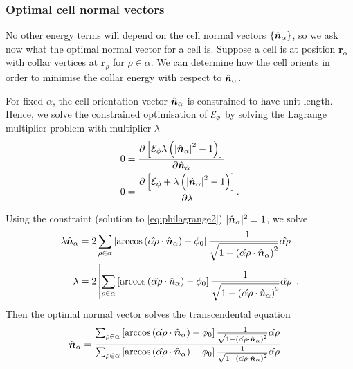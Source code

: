 \subsubsection{Optimal cell normal vectors} \label{subsubsec:opt_norm}

No other energy terms will depend on the cell normal vectors $\{ \hat{\bm{n}}_\alpha \}$, so we ask now what the optimal normal vector for a cell is. Suppose a cell is at position $\bm{r}_\alpha$ with collar vertices at $\bm{r}_\rho$ for $\rho \in \alpha$. We can determine how the cell orients in order to minimise the collar energy with respect to $\hat{\bm{n}}_\alpha$. 

For fixed $\alpha$, the cell orientation vector $\hat{\bm{n}}_\alpha$ is constrained to have unit length. Hence, we solve the constrained optimisation of $\mathcal{E}_\phi$ by solving the Lagrange multiplier problem with multiplier $\lambda$
\begin{align}
    0 &= \frac{\partial \left[ \mathcal{E}_\phi \lambda\left( \left| \hat{\bm{n}}_\alpha\right|^2 - 1\right) \right] }{\partial \hat{\bm{n}}_\alpha} \label{eq:philagrange1} \\
    0 &= \frac{\partial \left[ \mathcal{E}_\phi + \lambda\left( \left| \hat{\bm{n}}_\alpha\right|^2 - 1\right)\right] }{\partial \lambda}. \label{eq:philagrange2}
\end{align}

Using the constraint (solution to \cref{eq:philagrange2}) $| \hat{\bm{n}}_\alpha |^2 = 1$, we solve 
\begin{align*} 
    \lambda \hat{\bm{n}}_\alpha &= 2 \sum_{\rho\in\alpha} \left[ \arccos\left(\hat{\alpha\rho} \cdot \hat{\bm{n}}_\alpha \right) - \phi_0 \right] \frac{-1}{\sqrt{1 - \left(\hat{\alpha\rho} \cdot \hat{\bm{n}}_\alpha \right)^2 }} \hat{\alpha\rho} \\
    \lambda &= 2 \left| \sum_{\rho\in\alpha} \left[ \arccos\left(\hat{\alpha\rho} \cdot \hat{n}_\alpha \right) - \phi_0 \right] \frac{1}{\sqrt{1 - \left(\hat{\alpha\rho} \cdot \hat{n}_\alpha \right)^2 }} \hat{\alpha\rho} \right|.  
\end{align*}
\noindent Then the optimal normal vector solves the transcendental equation 
\begin{align}
    \hat{\bm{n}}_\alpha &= \frac{\sum_{\rho\in\alpha} \left[ \arccos\left(\hat{\alpha\rho} \cdot \hat{\bm{n}}_\alpha \right) - \phi_0 \right] \frac{-1}{\sqrt{1 - \left(\hat{\alpha\rho} \cdot \hat{\bm{n}}_\alpha \right)^2 }} \hat{\alpha\rho} }{\sum_{\rho\in\alpha} \left[ \arccos\left(\hat{\alpha\rho} \cdot \hat{\bm{n}}_\alpha \right) - \phi_0 \right] \frac{1}{\sqrt{1 - \left(\hat{\alpha\rho} \cdot \hat{\bm{n}}_\alpha \right)^2 }} \hat{\alpha\rho}} \label{eq:optimal_n}
\end{align}

